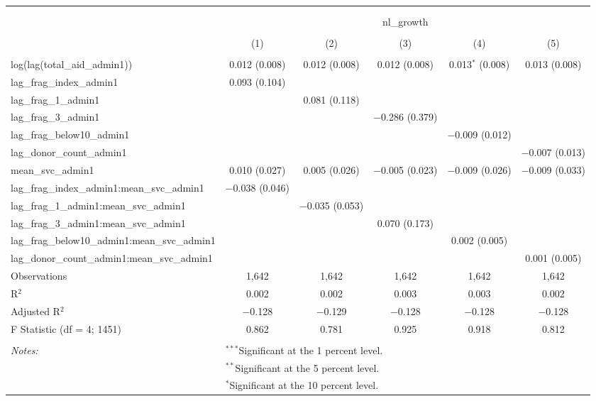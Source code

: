 
\begin{table}[!htbp] \centering 
  \caption{} 
  \label{} 
\begin{tabular}{@{\extracolsep{2pt}}lccccc} 
\\[-1.8ex]\hline 
\hline \\[-1.8ex] 
\\[-1.8ex] & \multicolumn{5}{c}{nl\_growth} \\ 
\\[-1.8ex] & (1) & (2) & (3) & (4) & (5)\\ 
\hline \\[-1.8ex] 
 log(lag(total\_aid\_admin1)) & 0.012 (0.008) & 0.012 (0.008) & 0.012 (0.008) & 0.013$^{*}$ (0.008) & 0.013 (0.008) \\ 
  lag\_frag\_index\_admin1 & 0.093 (0.104) &  &  &  &  \\ 
  lag\_frag\_1\_admin1 &  & 0.081 (0.118) &  &  &  \\ 
  lag\_frag\_3\_admin1 &  &  & $-$0.286 (0.379) &  &  \\ 
  lag\_frag\_below10\_admin1 &  &  &  & $-$0.009 (0.012) &  \\ 
  lag\_donor\_count\_admin1 &  &  &  &  & $-$0.007 (0.013) \\ 
  mean\_svc\_admin1 & 0.010 (0.027) & 0.005 (0.026) & $-$0.005 (0.023) & $-$0.009 (0.026) & $-$0.009 (0.033) \\ 
  lag\_frag\_index\_admin1:mean\_svc\_admin1 & $-$0.038 (0.046) &  &  &  &  \\ 
  lag\_frag\_1\_admin1:mean\_svc\_admin1 &  & $-$0.035 (0.053) &  &  &  \\ 
  lag\_frag\_3\_admin1:mean\_svc\_admin1 &  &  & 0.070 (0.173) &  &  \\ 
  lag\_frag\_below10\_admin1:mean\_svc\_admin1 &  &  &  & 0.002 (0.005) &  \\ 
  lag\_donor\_count\_admin1:mean\_svc\_admin1 &  &  &  &  & 0.001 (0.005) \\ 
 Observations & 1,642 & 1,642 & 1,642 & 1,642 & 1,642 \\ 
R$^{2}$ & 0.002 & 0.002 & 0.003 & 0.003 & 0.002 \\ 
Adjusted R$^{2}$ & $-$0.128 & $-$0.129 & $-$0.128 & $-$0.128 & $-$0.128 \\ 
F Statistic (df = 4; 1451) & 0.862 & 0.781 & 0.925 & 0.918 & 0.812 \\ 
\hline \\[-1.8ex] 
\textit{Notes:} & \multicolumn{5}{l}{$^{***}$Significant at the 1 percent level.} \\ 
 & \multicolumn{5}{l}{$^{**}$Significant at the 5 percent level.} \\ 
 & \multicolumn{5}{l}{$^{*}$Significant at the 10 percent level.} \\ 
\end{tabular} 
\end{table} 
